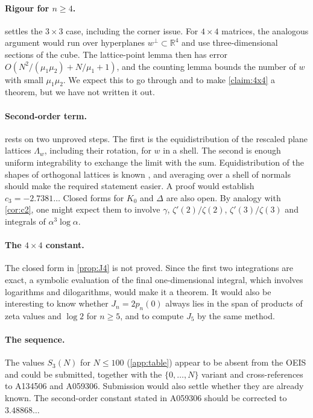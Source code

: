 \documentclass[11pt]{article}
\theoremstyle{definition}
\newcommand{\R}{\mathbb{R}}
\begin{document}
\paragraph{Rigour for $n\ge4$.}  settles the $3\times3$ case, including the corner issue. For $4\times4$ matrices, the analogous argument would run over hyperplanes $w^\perp\subset\R^4$ and use three-dimensional sections of the cube. The lattice-point lemma then has error $O(N^2/(\mu_1\mu_2)+N/\mu_1+1)$, and the counting lemma bounds the number of $w$ with small $\mu_1\mu_2$. We expect this to go through and to make \cref{claim:4x4} a theorem, but we have not written it out.

\paragraph{Second-order term.}  rests on two unproved steps. The first is the equidistribution of the rescaled plane lattices $\Lambda_w$, including their rotation, for $w$ in a shell. The second is enough uniform integrability to exchange the limit with the sum. Equidistribution of the shapes of orthogonal lattices is known \cite{AES}, and averaging over a shell of normals should make the required statement easier. A proof would establish $c_3=-2.7381\ldots$ Closed forms for $K_0$ and $\Delta$ are also open. By analogy with \cref{cor:c2}, one might expect them to involve $\gamma$, $\zeta'(2)/\zeta(2)$, $\zeta'(3)/\zeta(3)$ and integrals of $\alpha^3\log\alpha$.

\paragraph{The $4\times4$ constant.} The closed form in \cref{prop:J4} is not proved. Since the first two integrations are exact, a symbolic evaluation of the final one-dimensional integral, which involves logarithms and dilogarithms, would make it a theorem. It would also be interesting to know whether $J_n=2p_n(0)$ always lies in the span of products of zeta values and $\log2$ for $n\ge5$, and to compute $J_5$ by the same method.

\paragraph{The sequence.} The values $S_3(N)$ for $N\le 100$ (\cref{app:table}) appear to be absent from the OEIS and could be submitted, together with the $\{0,\dots,N\}$ variant and cross-references to A134506 and A059306. Submission would also settle whether they are already known. The second-order constant stated in A059306 should be corrected to $3.48868\ldots$
\end{document}
